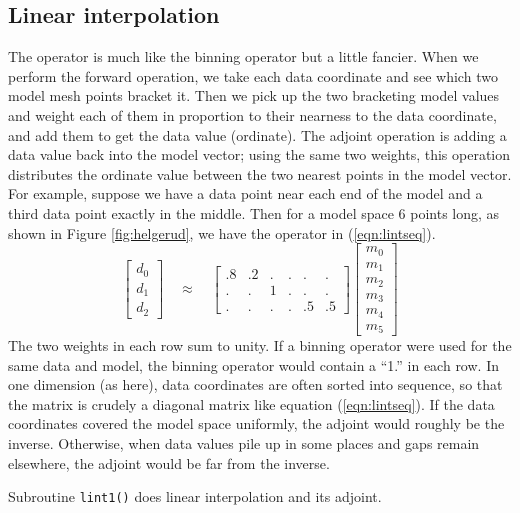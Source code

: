 \subsection{Linear interpolation}
\par
The 
operator is much like the binning operator but a little fancier.
When we perform the forward operation, we take each data coordinate
and see which two model mesh points bracket it.
Then we pick up the two bracketing model values
and weight each of them
in proportion to their nearness to the data coordinate,
and add them to get the data value (ordinate).
The adjoint operation is adding a data value
back into the model vector;
using the same two weights,
this operation distributes the ordinate value
between the two nearest points in the model vector.
For example, suppose we have a data point near each end of the model
and a third data point exactly in the middle.
Then for a model space 6 points long,
as shown in Figure \ref{fig:helgerud},
we have the operator in (\ref{eqn:lintseq}).
\begin{equation}
\left[
\begin{array}{c}
  d_0 \\
  d_1 \\
  d_2
  \end{array} \right]
\quad \approx \quad
\left[
\begin{array}{rrrrrr}
   .8 & .2 &  .  & .  & .  & .  \\
   .  & .  &  1  & .  & .  & .  \\
   .  & .  &  .  & .  & .5 & .5
  \end{array} \right]
\left[
	\begin{array}{c}
	  m_0 \\
	  m_1 \\
	  m_2 \\
	  m_3 \\
	  m_4 \\
	  m_5
	\end{array}
\right]
\label{eqn:lintseq}
\end{equation}
The two weights in each row sum to unity.
If a binning operator were used for the same data and model,
the binning operator would contain a ``1.'' in each row.
In one dimension (as here),
data coordinates are often sorted into sequence,
so that the matrix is crudely a diagonal matrix like equation (\ref{eqn:lintseq}).
If the data coordinates covered the model space uniformly,
the adjoint would roughly be the inverse.
Otherwise,
when data values pile up in some places and gaps remain elsewhere,
the adjoint would be far from the inverse.
\par
Subroutine \texttt{lint1()} does linear interpolation and its adjoint.


